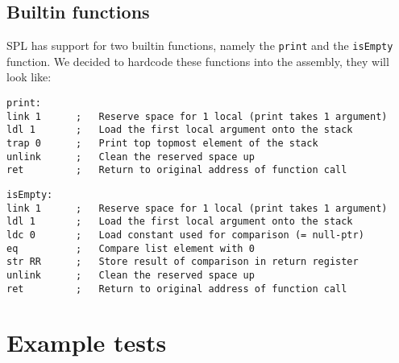 \documentclass[a4paper]{article}
\begin{document}
\subsection{Builtin functions}
SPL has support for two builtin functions, namely the {\tt print} and the {\tt isEmpty} function. We decided to hardcode these functions into the assembly, they will look like:

\begin{lstlisting}
print:
link 1		;	Reserve space for 1 local (print takes 1 argument)
ldl 1		;	Load the first local argument onto the stack
trap 0		;	Print top topmost element of the stack
unlink		;	Clean the reserved space up
ret			;	Return to original address of function call
\end{lstlisting}
\begin{lstlisting}
isEmpty:
link 1		;	Reserve space for 1 local (print takes 1 argument)
ldl 1		;	Load the first local argument onto the stack
ldc 0		;	Load constant used for comparison (= null-ptr)
eq			;	Compare list element with 0
str RR		;	Store result of comparison in return register
unlink		;	Clean the reserved space up
ret			;	Return to original address of function call
\end{lstlisting}

\newpage 
\section{Example tests}
\label{examples}
\end{document}
